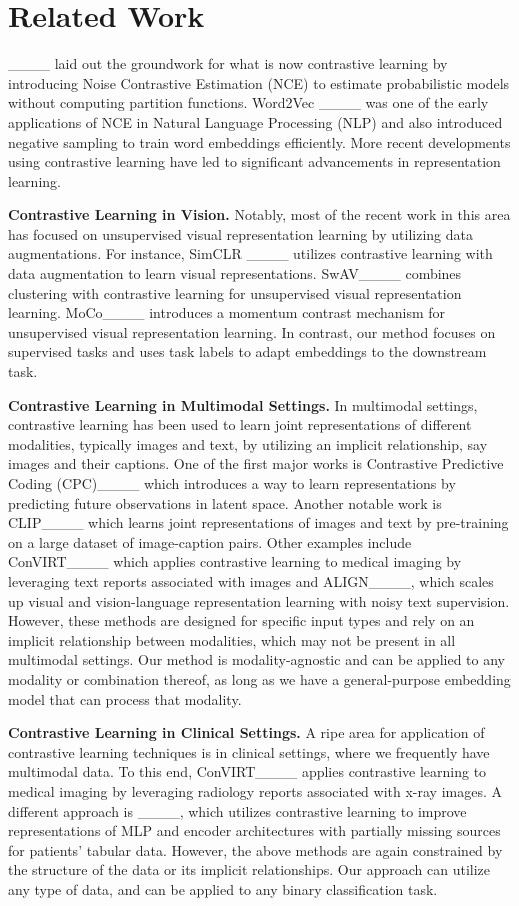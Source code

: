 \section{Related Work}
____ laid out the groundwork for what is now contrastive learning by introducing Noise Contrastive Estimation (NCE) to estimate probabilistic models without computing partition functions. 
Word2Vec ____ was one of the early applications of NCE in Natural Language Processing (NLP) and also introduced negative sampling to train word embeddings efficiently.
More recent developments using contrastive learning have led to significant advancements in representation learning. 

\textbf{Contrastive Learning in Vision.}
Notably, most of the recent work in this area has focused on unsupervised visual representation learning by utilizing data augmentations.
For instance, SimCLR ____ utilizes contrastive learning with data augmentation to learn visual representations. 
SwAV____ combines clustering with contrastive learning for unsupervised visual representation learning. 
MoCo____ introduces a momentum contrast mechanism for unsupervised visual representation learning. 
In contrast, our method focuses on supervised tasks and uses task labels to adapt embeddings to the downstream task.

\textbf{Contrastive Learning in Multimodal Settings.}
In multimodal settings, contrastive learning has been used to learn joint representations of different modalities, typically images and text, by utilizing an implicit relationship, say images and their captions.
One of the first major works is Contrastive Predictive Coding (CPC)____ which introduces a way to learn representations by predicting future observations in latent space. 
Another notable work is CLIP____ which learns joint representations of images and text by pre-training on a large dataset of image-caption pairs. Other examples include ConVIRT____ which applies contrastive learning to medical imaging by leveraging text reports associated with images and ALIGN____, which scales up visual and vision-language representation learning with noisy text supervision. However, these methods are designed for specific input types and rely on an implicit relationship between modalities, which may not be present in all multimodal settings. Our method is modality-agnostic and can be applied to any modality or combination thereof, as long as we have a general-purpose embedding model that can process that modality.

\textbf{Contrastive Learning in Clinical Settings.}
A ripe area for application of contrastive learning techniques is in clinical settings, where we frequently have multimodal data.
To this end, ConVIRT____ applies contrastive learning to medical imaging by leveraging radiology reports associated with x-ray images.
A different approach is ____, which utilizes contrastive learning to improve representations of MLP and encoder architectures with partially missing sources for patients' tabular data.
However, the above methods are again constrained by the structure of the data or its implicit relationships. Our approach can utilize any type of data, and can be applied to any binary classification task.

